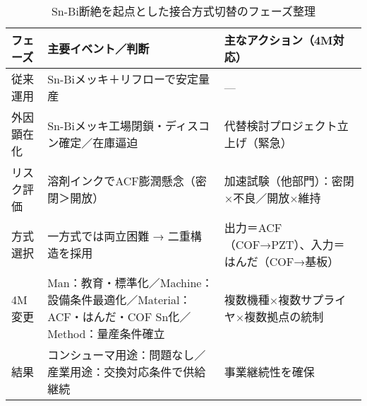 \documentclass[conference]{IEEEtran}
\begin{document}
\begin{table}[t]
\centering
\footnotesize
\caption{Sn-Bi断絶を起点とした接合方式切替のフェーズ整理}
\label{tab:flow}
\renewcommand{\arraystretch}{1.1}
\begin{tabularx}{\columnwidth}{@{}p{1.8cm} Y Y@{}}
\toprule
フェーズ & 主要イベント／判断 & 主なアクション（4M対応） \\
\midrule
従来運用 &
Sn-Biメッキ＋リフローで安定量産 &
— \\
\addlinespace[2pt]
外因顕在化 &
Sn-Biメッキ工場閉鎖・ディスコン確定／在庫逼迫 &
代替検討プロジェクト立上げ（緊急） \\
\addlinespace[2pt]
リスク評価 &
溶剤インクでACF膨潤懸念（密閉＞開放） &
加速試験（他部門）：密閉×不良／開放×維持 \\
\addlinespace[2pt]
方式選択 &
一方式では両立困難 → 二重構造を採用 &
出力＝ACF（COF→PZT）、入力＝はんだ（COF→基板） \\
\addlinespace[2pt]
4M変更 &
Man：教育・標準化／Machine：設備条件最適化／Material：ACF・はんだ・COF Sn化／Method：量産条件確立 &
複数機種×複数サプライヤ×複数拠点の統制 \\
\addlinespace[2pt]
結果 &
コンシューマ用途：問題なし／産業用途：交換対応条件で供給継続 &
事業継続性を確保 \\
\bottomrule
\end{tabularx}
\end{table}
\end{document}
